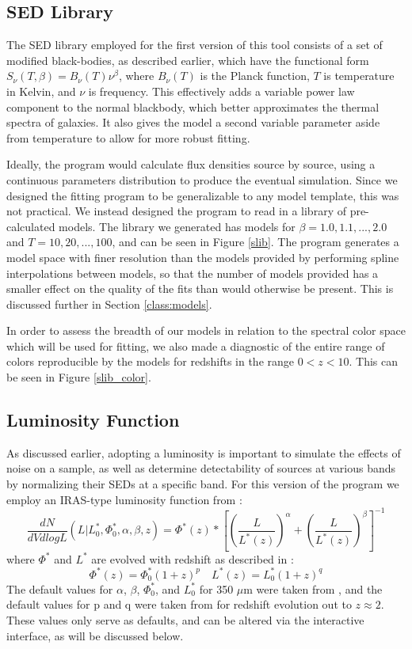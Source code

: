 \documentclass[twocolumn,letterpaper,10pt]{article}
\begin{document}
\subsection{SED Library}\label{sec:SED}
The SED library employed for the first version of this tool consists of a set of modified black-bodies, as described earlier, which have the functional form $S_\nu(T,\beta)=B_\nu(T)\nu^\beta$, where $B_\nu(T)$ is the Planck function, $T$ is temperature in Kelvin, and $\nu$ is frequency. This effectively adds a variable power law component to the normal blackbody, which better approximates the thermal spectra of galaxies. It also gives the model a second variable parameter aside from temperature to allow for more robust fitting. 

Ideally, the program would calculate flux densities source by source, using a continuous parameters distribution to produce the eventual simulation. Since we designed the fitting program to be generalizable to any model template, this was not practical. We instead designed the program to read in a library of pre-calculated models. The library we generated has models for $\beta = 1.0,1.1,...,2.0$ and $T=10,20,...,100$, and can be seen in Figure \ref{slib}. The program generates a model space with finer resolution than the models provided by performing spline interpolations between models, so that the number of models provided has a smaller effect on the quality of the fits than would otherwise be present. This is discussed further in Section \ref{class:models}.

In order to assess the breadth of our models in relation to the spectral color space which will be used for fitting, we also made a diagnostic of the entire range of colors reproducible by the models for redshifts in the range $0<z<10$. This can be seen in Figure \ref{slib_color}. 

\subsection{Luminosity Function}

As discussed earlier, adopting a luminosity is important to simulate the effects of noise on a sample, as well as determine detectability of sources at various bands by normalizing their SEDs at a specific band. For this version of the program we employ an IRAS-type luminosity function from \citet{negrelloIP}:
$$
\frac{dN}{dV dlogL}(L|L^*_0,\Phi^*_0,\alpha,\beta,z) = \Phi^*(z)*\left[{\left(\frac{L}{L^*(z)}\right)}^{\alpha}+\left(\frac{L}{L^*(z)}\right)^{\beta}\right]^{-1}
$$
where $\Phi^*$ and $L^*$ are evolved with redshift as described in \citet{Caputi07}:
$$
\Phi^*(z) = \Phi^*_0(1+z)^p \quad
L^*(z) = L^*_0(1+z)^q
$$
The default values for $\alpha$, $\beta$, $\Phi^*_0$, and $L^*_0$ for 350 $\mu$m were taken from \citet{negrelloIP}, and the default values for p and q were taken from \citet{Caputi07} for redshift evolution out to $z\approx2$. These values only serve as defaults, and can be altered via the interactive interface, as will be discussed below.
\end{document}
